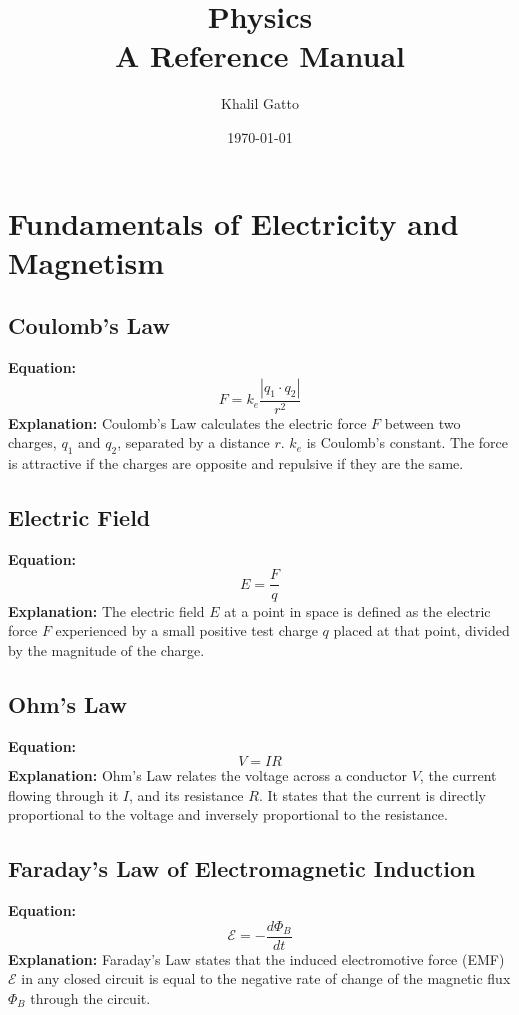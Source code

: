 \documentclass{article}
\title{Physics\\A Reference Manual}
\author{Khalil Gatto}
\date{\today}
\begin{document}
\maketitle


\section*{Fundamentals of Electricity and Magnetism}

\subsection*{Coulomb's Law}
\textbf{Equation:} 
\[ F = k_e \frac{{|q_1 \cdot q_2|}}{{r^2}} \]
\textbf{Explanation:} 
Coulomb's Law calculates the electric force \( F \) between two charges, \( q_1 \) and \( q_2 \), separated by a distance \( r \). \( k_e \) is Coulomb's constant. The force is attractive if the charges are opposite and repulsive if they are the same.



\subsection*{Electric Field}
\textbf{Equation:} 
\[ E = \frac{F}{q} \]
\textbf{Explanation:} 
The electric field \( E \) at a point in space is defined as the electric force \( F \) experienced by a small positive test charge \( q \) placed at that point, divided by the magnitude of the charge.


\subsection*{Ohm's Law}
\textbf{Equation:} 
\[ V = IR \]
\textbf{Explanation:} 
Ohm's Law relates the voltage across a conductor \( V \), the current flowing through it \( I \), and its resistance \( R \). It states that the current is directly proportional to the voltage and inversely proportional to the resistance.

\subsection*{Faraday's Law of Electromagnetic Induction}
\textbf{Equation:} 
\[ \mathcal{E} = -\frac{d\Phi_B}{dt} \]
\textbf{Explanation:} 
Faraday's Law states that the induced electromotive force (EMF) \( \mathcal{E} \) in any closed circuit is equal to the negative rate of change of the magnetic flux \( \Phi_B \) through the circuit.
\end{document}
